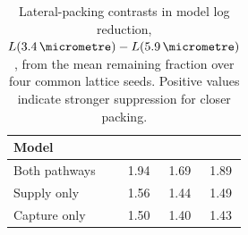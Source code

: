 \begin{table}[htbp]\centering\small
\caption{Lateral-packing contrasts in model log reduction, $L(3.4\,\si{\micrometre})-L(5.9\,\si{\micrometre})$, from the mean remaining fraction over four common lattice seeds. Positive values indicate stronger suppression for closer packing.}
\label{tab:spacing}
\begin{tabular}{lccc}\toprule
Model & \Ec{} & \Sa{} & \Pa{}\\\midrule
Both pathways & 1.94 & 1.69 & 1.89\\
Supply only & 1.56 & 1.44 & 1.49\\
Capture only & 1.50 & 1.40 & 1.43\\
\bottomrule\end{tabular}
\end{table}
